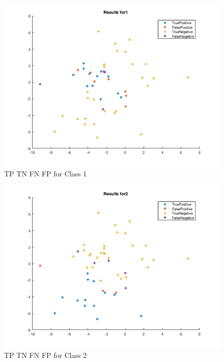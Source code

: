 \documentclass[12pt]{article}
\begin{document}
\begin{figure}[H]
\begin{center}
\includegraphics[scale=0.5]{images/class1}
\caption{TP TN FN FP for Class 1}
\label{default}
\end{center}
\end{figure}
\begin{figure}[H]
\begin{center}
\includegraphics[scale=0.5]{images/class2}
\caption{TP TN FN FP for Class 2}
\label{default}
\end{center}
\end{figure}
\end{document}
